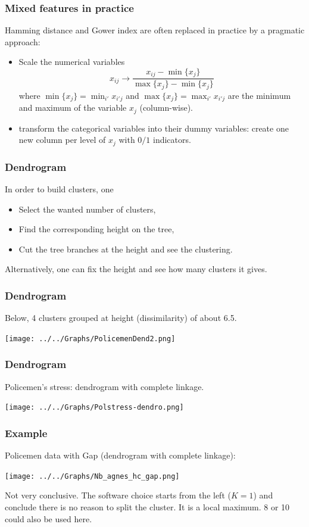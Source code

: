\begin{frame}
\frametitle{Mixed features in practice}
Hamming distance and Gower index are often replaced in practice by a pragmatic approach:
\begin{itemize}
\item Scale the numerical variables
$$
x_{ij} \rightarrow \frac{x_{ij} - \min\{x_{j}\}}{\max\{x_j\} - \min\{x_j\}}
$$ 
where $\min\{x_j\}=\min_{i'} x_{i'j}$ and $\max\{x_j\}=\max_{i'} x_{i'j}$ are the minimum and maximum of the variable $x_j$ (column-wise).
\item transform the categorical variables into their dummy variables: create one new column per level of $x_j$ with $0/1$ indicators. 
\end{itemize} 
\end{frame}
\begin{frame}
\frametitle{Dendrogram}
In order to build clusters, one 
\begin{itemize}
\item Select the wanted number of clusters,
\item Find the corresponding height on the tree,
\item Cut the tree branches at the height and see the clustering.
\end{itemize}
Alternatively, one can fix the height and see how many clusters it gives.
\end{frame}
\begin{frame}
\frametitle{Dendrogram}
Below, 4 clusters grouped at height (dissimilarity) of about 6.5.
\begin{center}
\texttt{[image: ../../Graphs/PolicemenDend2.png]}
\end{center}
\end{frame}
\begin{frame}
\frametitle{Dendrogram}
Policemen's stress: dendrogram with complete linkage.
\begin{center}
\texttt{[image: ../../Graphs/Polstress-dendro.png]}
\end{center}
\end{frame}
\begin{frame}
\frametitle{Example}
Policemen data with Gap (dendrogram with complete linkage):
\begin{center}
\texttt{[image: ../../Graphs/Nb\_agnes\_hc\_gap.png]}
\end{center}
Not very conclusive. The software choice starts from the left ($K=1$) and conclude there is no reason to split the cluster. It is a local maximum. 8 or 10 could also be used here. 
\end{frame}
